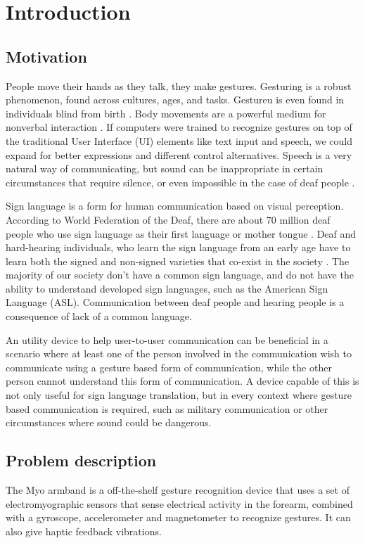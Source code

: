 \chapter{Introduction}
\label{chap:introduction}

\section{Motivation}
\label{sec:motivation}
People move their hands as they talk, they make gestures.  Gesturing is a robust phenomenon, found across cultures, ages, and tasks. Gestureu is even found in individuals blind from birth \cite{goldin1999role}. Body movements are a powerful medium for nonverbal interaction \cite{caramiaux2015understanding}. If computers were trained to recognize gestures on top of the traditional User Interface (UI) elements like text input and speech, we could expand for better expressions and different control alternatives. Speech is a very natural way of communicating, but sound can be inappropriate in certain circumstances that require silence, or even impossible in the case of deaf people \cite{paudyal2016sceptre}. 

Sign language is a form for human communication based on visual perception. According to World Federation of the Deaf, there are about 70 million deaf people who use sign language as their first language or mother tongue \cite{wfdeaf:sign_language}. Deaf and hard-hearing individuals, who learn the sign language from an early age have to learn both the signed and non-signed varieties that co-exist in the society \cite{bidoli2008english}. The majority of our society don't have a common sign language, and do not have the ability to understand developed sign languages, such as the American Sign Language (ASL). Communication between deaf people and hearing people is a consequence of lack of a common language.

An utility device to help user-to-user communication can be beneficial in a scenario where at least one of the person involved in the communication wish to communicate using a gesture based form of communication, while the other person cannot understand this form of communication. A device capable of this is not only useful for sign language translation, but in every context where gesture based communication is required, such as military communication or other circumstances where sound could be dangerous.


\section{Problem description}
\label{sec:problem_description}
The Myo armband is a off-the-shelf gesture recognition device that uses a set of electromyographic sensors that sense electrical activity in the forearm, combined with a gyroscope, accelerometer and magnetometer to recognize gestures. It can also give haptic feedback vibrations.

